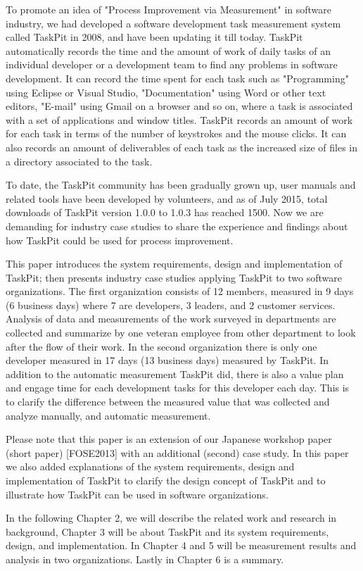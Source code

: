 \documentclass {article}
\begin{document}
	To promote an idea of "Process Improvement via Measurement" in software industry, we had developed a software development task measurement system called TaskPit\cite{taskpit} in 2008, and have been updating it till today. TaskPit automatically records the time and the amount of work of daily tasks of an individual developer or a development team to find any problems in software development. It can record the time spent for each task such as "Programming" using Eclipse or Visual Studio, "Documentation" using Word or other text editors, "E-mail" using Gmail on a browser and so on, where a task is associated with a set of applications and window titles. TaskPit records an amount of work for each task in terms of the number of keystrokes and the mouse clicks. It can also records an amount of deliverables of each task as the increased size of files in a directory associated to the task. \par
	To date, the TaskPit community has been gradually grown up, user manuals and related tools have been developed by volunteers, and as of July 2015, total downloads of TaskPit version 1.0.0 to 1.0.3 has reached 1500\cite{taskpit}. Now we are demanding for industry case studies to share the experience and findings about how TaskPit could be used for process improvement. \par
	This paper introduces the system requirements, design and implementation of TaskPit; then presents industry case studies applying TaskPit to two software organizations. The first organization consists of 12 members, measured in 9 days (6 business days) where 7 are developers, 3 leaders, and 2 customer services. Analysis of data and measurements of the work surveyed in departments are collected and summarize by one veteran employee from other department to look after the flow of their work. In the second organization there is only one developer measured in 17 days (13 business days) measured by TaskPit. In addition to the automatic measurement TaskPit did, there is also a value plan and engage time for each development tasks for this developer each day. This is to clarify the difference between the measured value that was collected and analyze manually, and automatic measurement. \par
	Please note that this paper is an extension of our Japanese workshop paper (short paper) [FOSE2013] with an additional (second) case study. In this paper we also added explanations of the system requirements, design and implementation of TaskPit to clarify the design concept of TaskPit and to illustrate how TaskPit can be used in software organizations. \par
	In the following Chapter 2, we will describe the related work and research in background, Chapter 3 will be about TaskPit and its system requirements, design, and implementation. In Chapter 4 and 5 will be measurement results and analysis in two organizations. Lastly in Chapter 6 is a summary.
	
\end{document}

